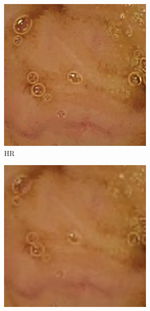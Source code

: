 \begin{figure}[H]
    \centering
        \begin{subfigure}[b]{0.275\textwidth}
    \includegraphics[width=\textwidth]{Chapter7/hr_9.jpg}
    \caption{HR}
  \end{subfigure}
  \begin{subfigure}[b]{0.275\textwidth}
    \includegraphics[width=\textwidth]{Chapter7/Bicubic_9.jpg}

\end{subfigure}
\end{figure}
